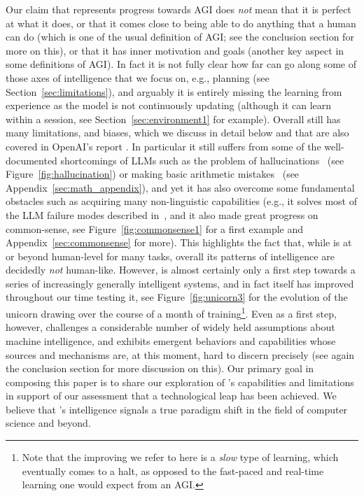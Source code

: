     Our claim that {\DV} represents progress towards AGI does {\em not} mean that it is perfect at what it does, or that it comes close to being able to do anything that a human can do (which is one of the usual definition of AGI; see the conclusion section for more on this), or that it has inner motivation and goals (another key aspect in some definitions of AGI). In fact it is not fully clear how far {\DV} can go along some of those axes of intelligence that we focus on, e.g., planning (see Section~\ref{sec:limitations}), and arguably it is entirely missing the learning from experience as the model is not continuously updating (although it can learn within a session, see Section~\ref{sec:environment1} for example).
    Overall {\DV} still has many limitations, and biases, which we discuss in detail below and that are also covered in OpenAI's report \cite{gpt4}. In particular it still suffers from some of the well-documented shortcomings of LLMs such as the problem of hallucinations~\cite{maynez2020faithfulness} (see Figure~\ref{fig:hallucination}) or making basic arithmetic mistakes~\cite{cobbe2021training} (see Appendix~\ref{sec:math_appendix}), and yet it has also overcome some fundamental obstacles such as acquiring many non-linguistic capabilities (e.g., it solves most of the LLM failure modes described in~\cite{mahowald2023dissociating}, and it also made great progress on common-sense, see Figure~\ref{fig:commonsense1} for a first example and Appendix~\ref{sec:commonsense} for more). This highlights the fact that, while {\DV} is at or beyond human-level for many tasks, overall its patterns of intelligence are decidedly {\em not} human-like. However, {\DV} is almost certainly only a first step towards a series of increasingly generally intelligent systems, and in fact {\DV} itself has improved throughout our time testing it, see Figure~\ref{fig:unicorn3} for the evolution of the unicorn drawing over the course of a month of training\footnote{Note that the improving we refer to here is a {\em slow} type of learning, which eventually comes to a halt, as opposed to the fast-paced and real-time learning one would expect from an AGI.}. Even as a first step, however, {\DV} challenges a considerable number of widely held assumptions about machine intelligence, and exhibits emergent behaviors and capabilities whose sources and mechanisms are, at this moment, hard to discern precisely (see again the conclusion section for more discussion on this). 
    Our primary goal in composing this paper is to share our exploration of {\DV}'s capabilities and limitations in support of our assessment that a technological leap has been achieved. We believe that {\DV}'s intelligence signals a true paradigm shift in the field of computer science and beyond. 
    
